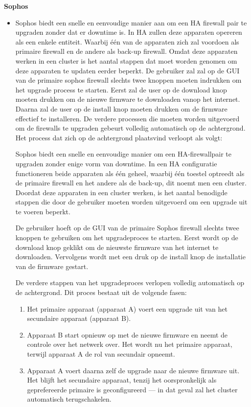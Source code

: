 \textbf{Sophos}
\begin{itemize}[label=\textbullet]
    \item Sophos biedt een snelle en eenvoudige manier aan om een HA firewall pair te upgraden zonder dat er downtime is. In HA zullen deze apparaten opereren als een enkele entiteit. Waarbij één van de apparaten zich zal voordoen als primaire firewall en de andere als back-up firewall. Omdat deze apparaten werken in een cluster is het aantal stappen dat moet worden genomen om deze apparaten te updaten eerder beperkt. De gebruiker zal zal op de GUI van de primaire sophos firewall slechts twee knoppen moeten indrukken om het upgrade process te starten. Eerst zal de user op de download knop moeten drukken om de nieuwe firmware te downloaden vanop het internet. Daarna zal de user op de install knop moeten drukken om de firmware effectief te installeren. De verdere processen die moeten worden uitgevoerd om de firewalls te upgraden gebeurt volledig automatisch op de achtergrond. Het process dat zich op de achtergrond plaatsvind verloopt als volgt:
    
    
    
    Sophos biedt een snelle en eenvoudige manier om een HA-firewallpair te upgraden zonder enige vorm van downtime. In een HA configuratie functioneren beide apparaten als één geheel, waarbij één toestel optreedt als de primaire firewall en het andere als de back-up, dit noemt men een cluster. Doordat deze apparaten in een cluster werken, is het aantal benodigde stappen die door de gebruiker moeten worden uitgevoerd om een upgrade uit te voeren beperkt.
    
    De gebruiker hoeft op de GUI van de primaire Sophos firewall slechts twee knoppen te gebruiken om het upgradeproces te starten. Eerst wordt op de download knop geklikt om de nieuwste firmware van het internet te downloaden. Vervolgens wordt met een druk op de install knop de installatie van de firmware gestart.
    
    De verdere stappen van het upgradeproces verlopen volledig automatisch op de achtergrond. Dit proces bestaat uit de volgende fasen:
    
    \begin{enumerate}
        \item Het primaire apparaat (apparaat A) voert een upgrade uit van het secundaire apparaat (apparaat B).
        \item Apparaat B start opnieuw op met de nieuwe firmware en neemt de controle over het netwerk over. Het wordt nu het primaire apparaat, terwijl apparaat A de rol van secundair opneemt.
        \item Apparaat A voert daarna zelf de upgrade naar de nieuwe firmware uit. Het blijft het secundaire apparaat, tenzij het oorspronkelijk als geprefereerde primaire is geconfigureerd — in dat geval zal het cluster automatisch terugschakelen.
    \end{enumerate}


\end{itemize}

